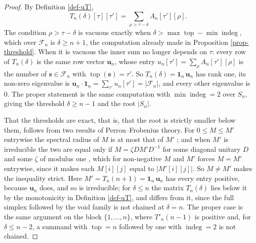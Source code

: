 \documentclass[11pt, a4paper, abstract=yes]{scrartcl}
\theoremstyle{definition}
\theoremstyle{remark}
\theoremstyle{plain}
\newcommand{\vek}[1]{\boldsymbol{#1}}
\newcommand{\indeg}{\operatorname{indeg}}
\newcommand{\tp}{\operatorname{top}}
\begin{document}
\begin{proof}
By Definition \ref{def-uT},
\[
  T_n(\delta)[\tau][\tau']=\sum_{\rho>\tau-\delta}A_n[\tau'][\rho] .
\]
The
condition \(\rho>\tau-\delta\) is vacuous exactly when \(\delta>\max\tp-\min\indeg\), which over
\(\mathcal F_n\) is \(\delta\ge n+1\), the computation already made in
Proposition \ref{prop-threshold}. When it is vacuous the inner sum no longer depends on \(\tau\):
every row of \(T_n(\delta)\) is the same row vector \(\vek u_n\), whose entry
\(u_n[\tau']=\sum_\rho A_n[\tau'][\rho]\) is the number of \(\vek s\in\mathcal F_n\) with
\(\tp(\vek s)=\tau'\). So \(T_n(\delta)=\vek1_n\,\vek u_n\) has rank one, its non-zero eigenvalue is
\(\vek u_n\cdot\vek1_n=\sum_{\tau'}u_n[\tau']=|\mathcal F_n|\), and
every other eigenvalue is \(0\). The proper statement is the same computation with \(\min\indeg=2\)
over \(S_n\), giving the threshold \(\delta\ge n-1\) and the root \(|S_n|\).

That the thresholds are exact, that is, that the root is strictly smaller below them, follows from
two results of Perron--Frobenius theory. For \(0\le M\le M'\) entrywise the spectral radius of
\(M\) is at most that of \(M'\) \autocite[Corollary 8.1.19]{HornJohnson2013}; and when \(M'\) is
irreducible the two are equal only if \(M=\zeta DM'D^{-1}\) for some diagonal unitary \(D\) and
some \(\zeta\) of modulus one \autocite[Theorem 8.4.5]{HornJohnson2013}, which for non-negative
\(M\) and \(M'\) forces \(M=M'\) entrywise, since it makes each \(M[i][j]\) equal to
\(|M'[i][j]|\). So \(M\ne M'\) makes the inequality strict.
Here \(M'=T_n(n+1)=\vek1_n\,\vek u_n\) has every entry positive,
because \(\vek u_n\) does, and so is irreducible; for \(\delta\le n\) the matrix \(T_n(\delta)\) lies
below it by the monotonicity in Definition \ref{def-uT}, and differs from it, since the full simplex
followed by the void family is not chained at \(\delta=n\). The proper case is the same argument on
the block \(\lbrace1,\dots,n\rbrace\), where \(T'_n(n-1)\) is positive and, for \(\delta\le n-2\), a
summand with \(\tp=n\) followed by one with \(\indeg=2\) is not chained.
\end{proof}
\end{document}
